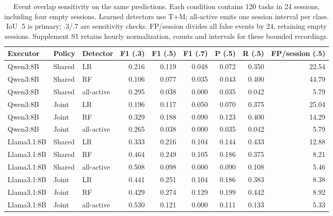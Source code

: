 \begin{table}[t]\centering\small
\caption{Event overlap sensitivity on the same predictions. Each condition contains 120 tasks in 24 sessions, including four empty sessions. Learned detectors use T+M; all-active emits one session interval per class. IoU .5 is primary; .3/.7 are sensitivity checks. FP/session divides all false events by 24, retaining empty sessions. Supplement S1 retains hourly normalization, counts and intervals for these bounded recordings.}\label{tab:randomized-events}
\setlength{\tabcolsep}{3pt}
\begin{tabularx}{\textwidth}{@{}llYrrrrrr@{}}\toprule
Executor & Policy & Detector & F1 (.3) & F1 (.5) & F1 (.7) & P (.5) & R (.5) & FP/session (.5) \\\midrule
Qwen3:8B & Shared & LR & 0.216 & 0.119 & 0.048 & 0.072 & 0.350 & 22.54 \\
Qwen3:8B & Shared & RF & 0.106 & 0.077 & 0.035 & 0.043 & 0.400 & 44.79 \\
Qwen3:8B & Shared & all-active & 0.295 & 0.038 & 0.000 & 0.035 & 0.042 & 5.79 \\
Qwen3:8B & Joint & LR & 0.196 & 0.117 & 0.050 & 0.070 & 0.375 & 25.04 \\
Qwen3:8B & Joint & RF & 0.329 & 0.188 & 0.090 & 0.123 & 0.400 & 14.29 \\
Qwen3:8B & Joint & all-active & 0.265 & 0.038 & 0.000 & 0.035 & 0.042 & 5.79 \\
Llama3.1:8B & Shared & LR & 0.333 & 0.216 & 0.104 & 0.144 & 0.433 & 12.88 \\
Llama3.1:8B & Shared & RF & 0.464 & 0.249 & 0.105 & 0.186 & 0.375 & 8.21 \\
Llama3.1:8B & Shared & all-active & 0.508 & 0.098 & 0.000 & 0.090 & 0.108 & 5.46 \\
Llama3.1:8B & Joint & LR & 0.441 & 0.251 & 0.104 & 0.186 & 0.383 & 8.38 \\
Llama3.1:8B & Joint & RF & 0.429 & 0.274 & 0.129 & 0.199 & 0.442 & 8.92 \\
Llama3.1:8B & Joint & all-active & 0.530 & 0.121 & 0.000 & 0.111 & 0.133 & 5.33 \\
\bottomrule\end{tabularx}
\end{table}
